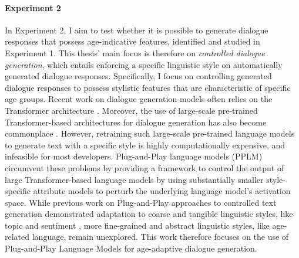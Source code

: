 \paragraph{Experiment 2} In Experiment 2, I aim to test whether it is possible to generate dialogue responses that possess age-indicative features, identified and studied in Experiment 1.
This thesis' main focus is therefore on \textit{controlled dialogue generation}, which entails enforcing a specific linguistic style on automatically generated dialogue responses.
Specifically, I focus on controlling generated dialogue responses to possess stylistic features that are characteristic of specific age groups.
Recent work on dialogue generation models often relies on the Transformer architecture \citep{vaswani2017attention}. Moreover, the use of large-scale pre-trained Transformer-based architectures for dialogue generation has also become commonplace \citep{zhang2019dialogpt, brown2020language-models-few-shot-gpt3}.
However, retraining such large-scale pre-trained language models to generate text with a specific style is highly computationally expensive, and infeasible for most developers.
Plug-and-Play language models (PPLM) \citep{dathathri2019plug} circumvent these problems by providing a framework to control the output of large Transformer-based language models by using substantially smaller style-specific attribute models to perturb the underlying language model's activation space.
While previous work on Plug-and-Play approaches to controlled text generation demonstrated adaptation to coarse and tangible linguistic styles, like topic and sentiment \citep{madotto-etal-2020-plug}, more fine-grained and abstract linguistic styles, like age-related language, remain unexplored.
This work therefore focuses on the use of Plug-and-Play Language Models for age-adaptive dialogue generation.

